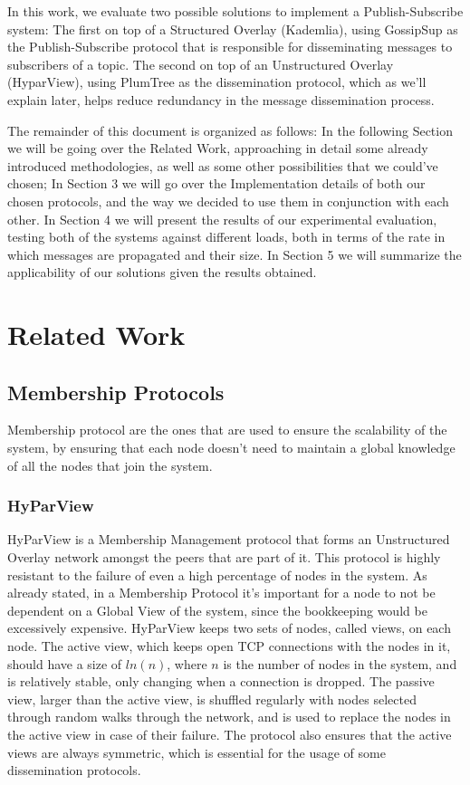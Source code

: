 \documentclass[sigconf]{acmart}
\begin{document}
In this work, we evaluate two possible solutions to implement a Publish-Subscribe system: The first on top of a Structured Overlay (Kademlia), using GossipSup as the Publish-Subscribe protocol that is responsible for disseminating messages to subscribers of a topic.
The second on top of an Unstructured Overlay (HyparView), using PlumTree as the dissemination protocol, which as we'll explain later, helps reduce redundancy in the message dissemination process.

The remainder of this document is organized as follows:
In the following Section we will be going over the Related Work, approaching in detail some already introduced methodologies, as well as some other possibilities that we could've chosen; In Section 3 we will go over the Implementation details of both our chosen protocols, and the way we decided to use them in conjunction with each other. In Section 4 we will present the results of our experimental evaluation, testing both of the systems against different loads, both in terms of the rate in which messages are propagated and their size. In Section 5 we will summarize the applicability of our solutions given the results obtained.

\section{Related Work}

\subsection{Membership Protocols}

Membership protocol are the ones that are used to ensure the scalability of the system, by ensuring that each node doesn't need to maintain a global knowledge of all the nodes that join the system.

\subsubsection{HyParView}

HyParView is a Membership Management protocol that forms an Unstructured Overlay network amongst the peers that are part of it.
This protocol is highly resistant to the failure of even a high percentage of nodes in the system. As already stated, in a Membership Protocol it’s important for a node to not be dependent on a Global View of the system, since the bookkeeping would be excessively expensive. HyParView keeps two sets of nodes, called views, on each node. The active view, which keeps open TCP connections with the nodes in it, should have a size of $ln(n)$, where $n$ is the number of nodes in the system, and is relatively stable, only changing when a connection is dropped. The passive view, larger than the active view, is shuffled regularly with nodes selected through random walks through the network, and is used to replace the nodes in the active view in case of their failure.
The protocol also ensures that the active views are always symmetric, which is essential for the usage of some dissemination protocols.
\end{document}
